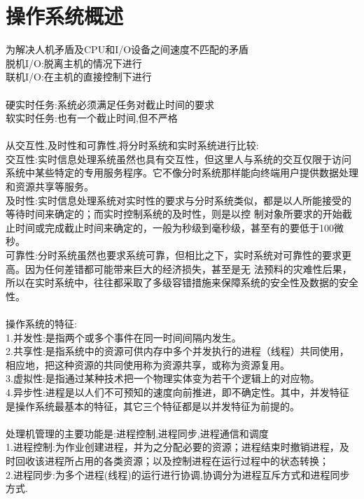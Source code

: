 \documentclass[UTF8]{article}
\begin{document}
    \section*{操作系统概述}
    为解决人机矛盾及CPU和I/O设备之间速度不匹配的矛盾\\
    脱机I/O:脱离主机的情况下进行\\
    联机I/O:在主机的直接控制下进行\\
    \\
    硬实时任务:系统必须满足任务对截止时间的要求\\
    软实时任务:也有一个截止时间,但不严格\\
    \\
    从交互性,及时性和可靠性,将分时系统和实时系统进行比较:\\
    交互性:实时信息处理系统虽然也具有交互性，但这里人与系统的交互仅限于访问系统中某些特定的专用服务程序。它不像分时系统那样能向终端用户提供数据处理和资源共享等服务。\\
    及时性:实时信息处理系统对实时性的要求与分时系统类似，都是以人所能接受的等待时间来确定的；而实时控制系统的及时性，则是以控 制对象所要求的开始截止时间或完成截止时间来确定的，一般为秒级到毫秒级，甚至有的要低于100微秒。\\
    可靠性:分时系统虽然也要求系统可靠，但相比之下，实时系统对可靠性的要求更高。因为任何差错都可能带来巨大的经济损失，甚至是无 法预料的灾难性后果，所以在实时系统中，往往都采取了多级容错措施来保障系统的安全性及数据的安全性。\\
    \\
    操作系统的特征:\\
    1.并发性:是指两个或多个事件在同一时间间隔内发生。\\
    2.共享性:是指系统中的资源可供内存中多个并发执行的进程（线程）共同使用，相应地，把这种资源的共同使用称为资源共享，或称为资源复用。\\
    3.虚拟性:是指通过某种技术把一个物理实体变为若干个逻辑上的对应物。\\
    4.异步性:进程是以人们不可预知的速度向前推进，即不确定性。其中，并发特征是操作系统最基本的特征，其它三个特征都是以并发特征为前提的。\\
    \\
    处理机管理的主要功能是:进程控制,进程同步,进程通信和调度\\
    1.进程控制:为作业创建进程，并为之分配必要的资源；进程结束时撤销进程，及时回收该进程所占用的各类资源；以及控制进程在运行过程中的状态转换；\\
    2.进程同步:为多个进程(线程)的运行进行协调,协调分为进程互斥方式和进程同步方式.\\
\end{document}
